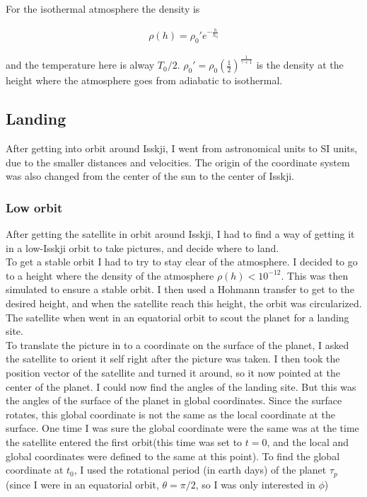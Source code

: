 \documentclass[a4paper, 10pt]{article}
\begin{document}
For the isothermal atmosphere the density is

\begin{align}
\rho (h) = \rho_0'e^{-\frac{h}{h_0}}
\end{align}

and the temperature here is alway $T_0/2$. $\rho_0' = \rho_0 \left( \frac{1}{2} \right) ^{\frac{1}{\gamma + 1}}$ is the density at the height where the atmosphere goes from adiabatic to isothermal.


\subsection{Landing}
After getting into orbit around Isskji, I went from astronomical units to SI units, due to the smaller distances and velocities. The origin of the coordinate system was also changed from the center of the sun to the center of Isskji.

\subsubsection{Low orbit}
After getting the satellite in orbit around Isskji, I had to find a way of getting it in a low-Isskji orbit to take pictures, and decide where to land.\\

To get a stable orbit I had to try to stay clear of the atmosphere. I decided to go to a height where the density of the atmosphere $\rho (h) < 10^{-12}$. This was then simulated to ensure a stable orbit. I then used a Hohmann transfer to get to the desired height, and when the satellite reach this height, the orbit was circularized. The satellite when went in an equatorial orbit to scout the planet for a landing site.\\

To translate the picture in to a coordinate on the surface of the planet, I asked the satellite to orient it self right after the picture was taken. I then took the position vector of the satellite and turned it around, so it now pointed at the center of the planet. I could now find the angles of the landing site. But this was the angles of the surface of the planet in global coordinates. Since the surface rotates, this global coordinate is not the same as the local coordinate at the surface. One time I was sure the global coordinate were the same was at the time the satellite entered the first orbit(this time was set to $t = 0$, and the local and global coordinates were defined to the same at this point). To find the global coordinate at $t_0$, I used the rotational period (in earth days) of the planet $\tau_p$ (since I were in an equatorial orbit, $\theta = \pi /2$, so I was only interested in $\phi$)
\end{document}
